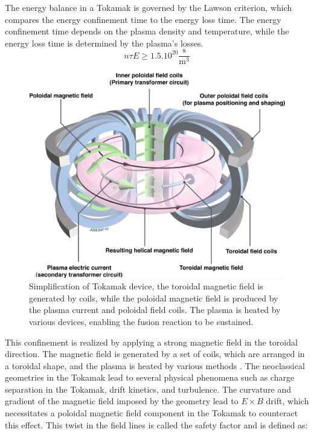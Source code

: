 \documentclass[11pt,a4paper,openany]{report}
\begin{document}
\begin{multicols}{2}
    The energy balance in a Tokamak is governed by the Lawson criterion, which compares the energy confinement time to the energy loss time. The energy confinement time depends on the plasma density and temperature, while the energy loss time is determined by the plasma's losses.
    $$n \tau E \ge 1.5.10^{20}{\frac {\mathrm {s} }{\mathrm {m} ^{3}}}$$
    \begin{figure}[H]
        \centering
        \includegraphics[width=1\linewidth]{./figures/tokamak.png}
        \caption{Simplification of Tokamak device, the toroidal magnetic field is generated by coils, while the poloidal magnetic field is produced by the plasma current and poloidal field coils. The plasma is heated by various devices, enabling the fusion reaction to be sustained.}
        \label{}
    \end{figure}
    This confinement is realized by applying a strong magnetic field in the toroidal direction. The magnetic field is generated by a set of coils, which are arranged in a toroidal shape, and the plasma is heated by various methods \cite{Heating}. The neoclassical geometries in the Tokamak lead to several physical phenomena such as charge separation in the Tokamak, drift kinetics, and turbulence. The curvature and gradient of the magnetic field \cite{piel2018plasma} imposed by the geometry lead to $E \times B$ drift, which necessitates a poloidal magnetic field component in the Tokamak to counteract this effect. This twist in the field lines is called the safety factor and is defined as:


\end{multicols}
\end{document}
